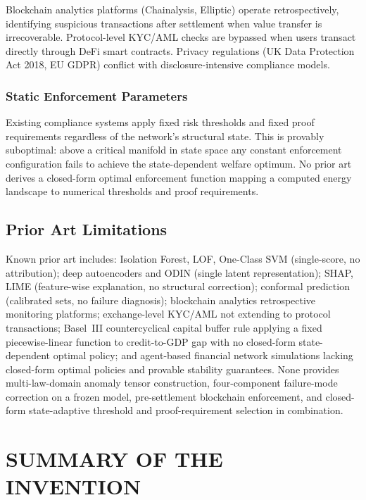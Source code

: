 \documentclass[12pt,a4paper]{article}
\begin{document}
Blockchain analytics platforms (Chainalysis, Elliptic) operate
retrospectively, identifying suspicious transactions after settlement
when value transfer is irrecoverable. Protocol-level KYC/AML checks
are bypassed when users transact directly through DeFi smart contracts.
Privacy regulations (UK Data Protection Act 2018, EU GDPR) conflict with
disclosure-intensive compliance models.

\subsubsection{Static Enforcement Parameters}

Existing compliance systems apply fixed risk thresholds and fixed proof
requirements regardless of the network's structural state. This is
provably suboptimal: above a critical manifold in state space any constant
enforcement configuration fails to achieve the state-dependent welfare
optimum. No prior art derives a closed-form optimal enforcement function
mapping a computed energy landscape to numerical thresholds and proof
requirements.

\subsection{Prior Art Limitations}

Known prior art includes: Isolation Forest, LOF, One-Class SVM (single-score,
no attribution); deep autoencoders and ODIN (single latent representation);
SHAP, LIME (feature-wise explanation, no structural correction); conformal
prediction (calibrated sets, no failure diagnosis); blockchain analytics
retrospective monitoring platforms; exchange-level KYC/AML not extending
to protocol transactions; Basel~III countercyclical capital buffer rule
applying a fixed piecewise-linear function to credit-to-GDP gap with no
closed-form state-dependent optimal policy; and agent-based financial
network simulations lacking closed-form optimal policies and provable
stability guarantees. None provides multi-law-domain anomaly tensor
construction, four-component failure-mode correction on a frozen model,
pre-settlement blockchain enforcement, and closed-form state-adaptive
threshold and proof-requirement selection in combination.

\section{SUMMARY OF THE INVENTION}
\end{document}
